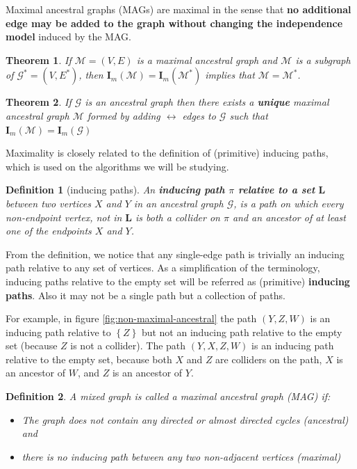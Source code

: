 \documentclass[a4paper]{article}
\newtheorem{definition}{Definition}
\newtheorem{theorem}{Theorem}
\begin{document}
Maximal ancestral graphs (MAGs) are maximal in the sense that \textbf{no additional edge may be added to the graph without changing the independence model} induced by the MAG.

\begin{theorem}If $\mathcal{M} = (V,E)$ is a maximal ancestral graph and $\mathcal{M}$ is a subgraph of $\mathcal{G}^* = (V,E^*)$, then $\mathbf{I}_m (\mathcal{M}) = \mathbf{I}_m(\mathcal{M}^*)$ implies that $\mathcal{M} = \mathcal{M}^*$.
\end{theorem}

\begin{theorem}If $\mathcal{G}$ is an ancestral graph then there exists a \textbf{unique} maximal ancestral graph $\mathcal{M}$ formed by adding $\leftrightarrow$ edges to $\mathcal{G}$ such that $\mathbf{I}_m (\mathcal{M}) = \mathbf{I}_m(\mathcal{G})$
\end{theorem}

Maximality is closely related to the definition of (primitive) inducing paths, which is used on the algorithms we will be studying.

\begin{definition}[inducing paths]
	An \textbf{inducing path $\pi$ relative to a set} $\mathbf{L}$ between two vertices $X$ and $Y$ in an ancestral graph $\mathcal{G}$, is a path on which every non-endpoint vertex, \textit{not} in $\mathbf{L}$ is both a collider on $\pi$ and an ancestor of \textit{at least one} of the endpoints $X$ and $Y$.
\end{definition}

From the definition, we notice that any single-edge path is trivially an inducing path relative to any set of vertices. As a simplification of the terminology, inducing paths relative to the empty set will be referred as (primitive) \textbf{inducing paths}. Also it may not be a single path but a collection of paths.

For example, in figure \ref{fig:non-maximal-ancestral} the path $(Y,Z,W)$ is an inducing path relative to $\left\{ Z\right\}$ but not an inducing path relative to the empty set (because $Z$ is not a collider). The path $(Y,X,Z,W)$ is an inducing path relative to the empty set, because both $X$ and $Z$ are colliders on the path, $X$ is an ancestor of $W$, and $Z$ is an ancestor of $Y$.

\begin{definition}A mixed graph is called a maximal ancestral graph (MAG) if:
	\begin{itemize}
		\item The graph does not contain any directed or almost directed cycles (ancestral) and
		\item there is \textit{no inducing path} between any two non-adjacent vertices (maximal)
	\end{itemize}
\end{definition}
\end{document}
